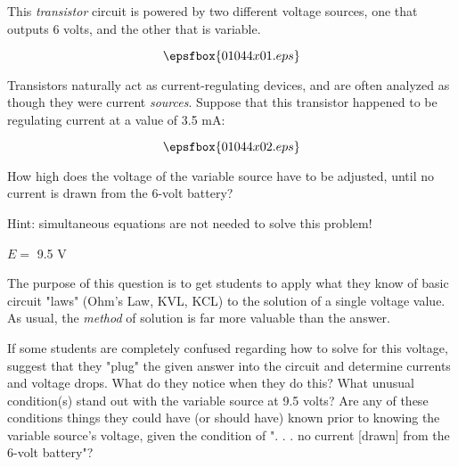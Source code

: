 

This {\it transistor} circuit is powered by two different voltage sources, one that outputs 6 volts, and the other that is variable.

$$\epsfbox{01044x01.eps}$$

Transistors naturally act as current-regulating devices, and are often analyzed as though they were current {\it sources}.  Suppose that this transistor happened to be regulating current at a value of 3.5 mA:

$$\epsfbox{01044x02.eps}$$

How high does the voltage of the variable source have to be adjusted, until no current is drawn from the 6-volt battery?

\vskip 10pt

Hint: simultaneous equations are not needed to solve this problem!







$E =$ 9.5 V







The purpose of this question is to get students to apply what they know of basic circuit "laws" (Ohm's Law, KVL, KCL) to the solution of a single voltage value.  As usual, the {\it method} of solution is far more valuable than the answer.

If some students are completely confused regarding how to solve for this voltage, suggest that they "plug" the given answer into the circuit and determine currents and voltage drops.  What do they notice when they do this?  What unusual condition(s) stand out with the variable source at 9.5 volts?  Are any of these conditions things they could have (or should have) known prior to knowing the variable source's voltage, given the condition of ". . . no current [drawn] from the 6-volt battery"?



